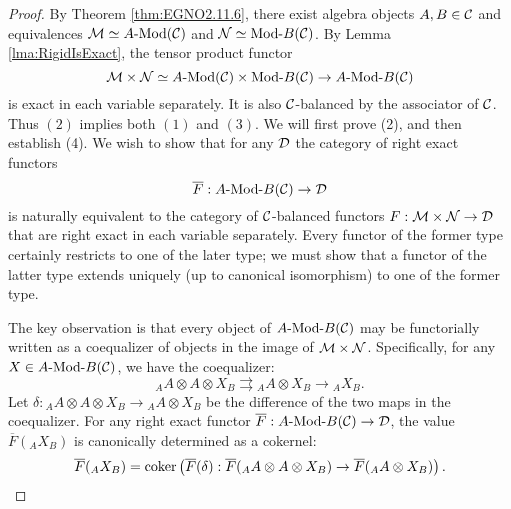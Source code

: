 \documentclass{amsart}
\begin{document}
\begin{proof}
	 By Theorem \ref{thm:EGNO2.11.6}, there exist algebra objects $A, B \in \mathcal C$ and equivalences $\cM \simeq \Mod{A}{}(\cC)$ and $\cN \simeq \Mod{}{B}(\cC)$. By Lemma \ref{lma:RigidIsExact}, the tensor product functor
	\begin{equation*}
		\cM \times \cN \simeq \Mod{A}{}(\cC) \times  \Mod{}{B}(\cC) \to \Mod{A}{B}(\cC)
	\end{equation*}
	is exact in each variable separately. It is also $\mathcal C$-balanced by the associator of $\mathcal C$. Thus $(2)$ implies both  $(1)$ and $(3)$. 
	We will first prove (2), and then establish (4).  We wish to show that for any $\mathcal D$ the category of right exact functors 
\begin{equation*}
	\overline{F}:\Mod{A}{B}(\cC) \to \cD
\end{equation*}
	is naturally equivalent to the category of $\mathcal C$-balanced functors $F:\mathcal M \times \mathcal N \to \mathcal D$ that are right exact in each variable separately. Every functor of the former type certainly restricts to one of the later type; we must show that a functor of the latter type extends uniquely (up to canonical isomorphism) to one of the former type. 
	
The key observation is that every object of $\Mod{A}{B}(\cC)$ may be functorially written as a coequalizer of objects in the image of $\mathcal M \times \mathcal N$. Specifically, for any $X \in \Mod{A}{B}(\cC)$, we have the coequalizer:
\begin{equation*}
	{}_A A \otimes A \otimes X_B \rightrightarrows {}_A A \otimes X_B \to {}_A X_B.
\end{equation*}
Let $\delta: {}_A A \otimes A \otimes X_B \to {}_A A \otimes X_B$ be the difference of the two maps in the coequalizer. 
For any right exact functor $\overline{F}: \Mod{A}{B}(\cC) \to \cD$, the value $\overline{F}({}_A X_B)$ is canonically determined as a cokernel:
\begin{equation*}
	\overline{F}({}_A X_B) = \operatorname*{coker} \left( \overline{F}(\delta): \overline{F}({}_A A \otimes A \otimes X_B) \to \overline{F}({}_A A \otimes X_B) \right).
\end{equation*} 
	

\end{proof}
\end{document}
